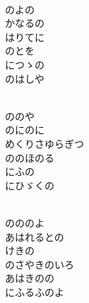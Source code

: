 \documentclass[10pt,b5j]{tarticle} %
\begin{document}
\vspace{1.5em} %
\newcommand{\linespace}{0.5em} %
\newcommand{\blocksize}{0.5\hsize} %
\newcommand{\itemmargin}{6em} %
\begin{enumerate} %
    \setlength{\itemindent}{\itemmargin} %
    \begin{minipage}[c]{\blocksize}
    
        \vspace{\linespace}
        \item~\\
        のよの\\
        かなるの\\
        はりてに\\
        のとを\\
        につゝの\\
        のはしや
        
        \vspace{\linespace}
        \item~\\
        ののや\\
        のにのに\\
        めくりさゆらぎつ\\
        ののほのる\\
        にふの\\
        にひゞくの
        
        \vspace{\linespace}
        \item~\\
        のののよ\\
        あはれるとの\\
        けきの\\
        のさやきのいろ\\
        あはきのの\\
        にふるふのよ
        

\end{minipage}
\end{enumerate}
\end{document}
